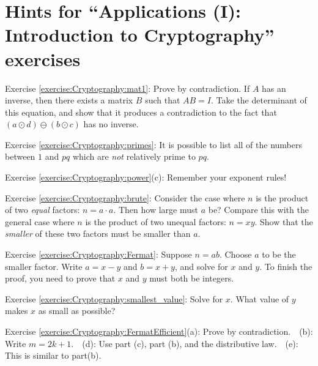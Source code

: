 \section{Hints for ``Applications (I): Introduction to Cryptography'' exercises}
\label{sec:Cryptography:Hints}

\noindent Exercise \ref{exercise:Cryptography:mat1}: Prove by contradiction.  If $A$ has an inverse, then there exists a matrix $B$ such that $AB = I$.  Take the determinant of this equation, and show that it produces a contradiction to the fact that $(a \odot d)  \ominus (b \odot c)$ has no inverse.

\noindent Exercise \ref{exercise:Cryptography:primes}: It is possible to list all of the numbers between $1$ and $pq$ which are \emph{not} relatively prime to $pq$.

\noindent Exercise \ref{exercise:Cryptography:power}(c): Remember your exponent rules!

\noindent Exercise \ref{exercise:Cryptography:brute}: Consider the case where $n$ is the product of two \emph{equal} factors:  $n=a \cdot a$. Then how large must $a$ be?  Compare this with the general case where $n$ is the product of two unequal factors:  $n = xy$. Show that the \emph{smaller} of these two factors must be smaller than $a$.

\noindent Exercise \ref{exercise:Cryptography:Fermat}: Suppose $n=ab$. Choose $a$ to be the smaller factor.  Write $a = x-y$ and $b = x+y$, and solve for $x$ and $y$. To finish the proof, you need to prove that $x$ and $y$ must both be integers.

\noindent Exercise \ref{exercise:Cryptography:smallest_value}: Solve for $x$. What value of $y$ makes $x$ as small as possible?

\noindent Exercise \ref{exercise:Cryptography:FermatEfficient}(a): Prove by contradiction.~~(b): Write $m = 2k+1$.~~(d): Use part (c), part (b), and the distributive law.~~(e): This is similar to part(b).